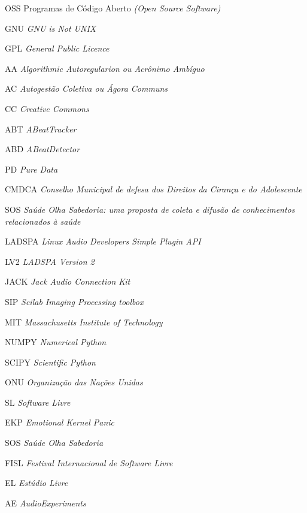 \resumoeabstract %

\listadefiguras %

\listadetabelas %

	\begin{listaespecial}[BIGNAMEWIDTH]
		\item[OSS] Programas de Código Aberto \emph{(Open Source Software)}
		\item[GNU] \emph{GNU is Not UNIX}
		\item[GPL] \emph{General Public Licence}
                \item[AA] \emph{Algorithmic Autoregularion ou Acrônimo Ambíguo}
                \item[AC] \emph{Autogestão Coletiva ou Ágora Communs}
                \item[CC] \emph{Creative Commons}
                \item[ABT] \emph{ABeatTracker}
                \item[ABD] \emph{ABeatDetector}
                \item[PD] \emph{Pure Data}
                \item[CMDCA] \emph{Conselho Municipal de defesa dos Direitos da Cirança e do Adolescente}
                \item[SOS] \emph{Saúde Olha Sabedoria: uma proposta de coleta e difusão de conhecimentos relacionados à saúde}
                \item[LADSPA] \emph{Linux Audio Developers Simple Plugin API}
                \item[LV2] \emph{LADSPA Version 2}
                \item[JACK] \emph{Jack Audio Connection Kit}
                \item[SIP] \emph{Scilab Imaging Processing toolbox}
                \item[MIT] \emph{Massachusetts Institute of Technology}
                \item[NUMPY] \emph{Numerical Python}
                \item[SCIPY] \emph{Scientific Python}
                \item[ONU] \emph{Organização das Nações Unidas}
                \item[SL] \emph{Software Livre}
                \item[EKP] \emph{Emotional Kernel Panic}
                \item[SOS] \emph{Saúde Olha Sabedoria}
                \item[FISL] \emph{Festival Internacional de Software Livre}
		\item[EL] \emph{Estúdio Livre}
		\item[AE] \emph{AudioExperiments}
	\end{listaespecial} 


